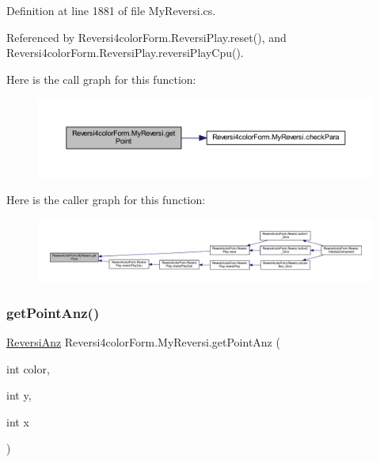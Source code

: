 Definition at line 1881 of file My\+Reversi.\+cs.



Referenced by Reversi4color\+Form.\+Reversi\+Play.\+reset(), and Reversi4color\+Form.\+Reversi\+Play.\+reversi\+Play\+Cpu().

Here is the call graph for this function\+:\nopagebreak
\begin{figure}[H]
\begin{center}
\leavevmode
\includegraphics[width=350pt]{class_reversi4color_form_1_1_my_reversi_a5af52fd8272221e7fecfc8375a9f7be2_cgraph}
\end{center}
\end{figure}
Here is the caller graph for this function\+:\nopagebreak
\begin{figure}[H]
\begin{center}
\leavevmode
\includegraphics[width=350pt]{class_reversi4color_form_1_1_my_reversi_a5af52fd8272221e7fecfc8375a9f7be2_icgraph}
\end{center}
\end{figure}
\mbox{\label{class_reversi4color_form_1_1_my_reversi_ad0027ead546dfa8a7844e54fb0dddfab}} 
\subsubsection{\texorpdfstring{get\+Point\+Anz()}{getPointAnz()}}
{\footnotesize\ttfamily \hyperlink{class_reversi4color_form_1_1_reversi_anz}{Reversi\+Anz} Reversi4color\+Form.\+My\+Reversi.\+get\+Point\+Anz (\begin{DoxyParamCaption}\item[{int}]{color,  }\item[{int}]{y,  }\item[{int}]{x }\end{DoxyParamCaption})}




